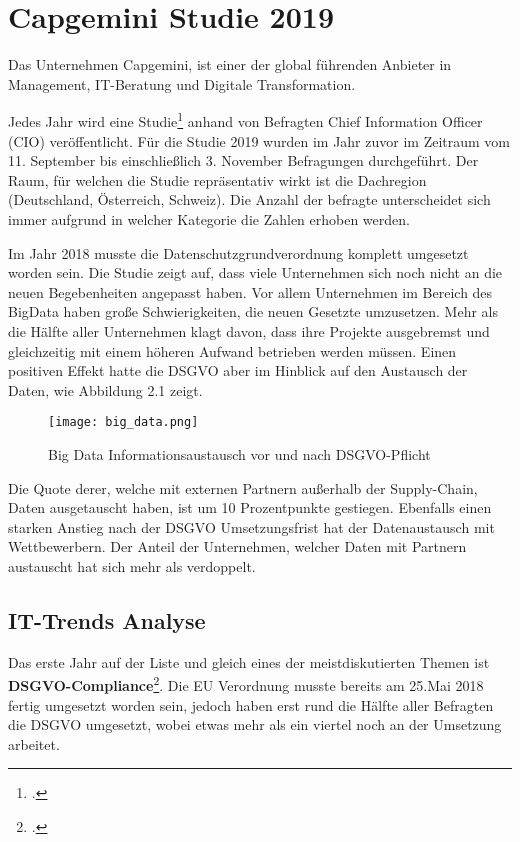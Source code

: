 \section{Capgemini Studie 2019}
Das Unternehmen Capgemini, ist einer der global führenden Anbieter in Management, IT-Beratung und Digitale Transformation.

Jedes Jahr wird eine Studie\footcite{Capgemini-Studie} anhand von Befragten Chief Information Officer (CIO) veröffentlicht. Für die Studie 2019 wurden im Jahr zuvor im Zeitraum vom 11. September bis einschließlich 3. November Befragungen durchgeführt. Der Raum, für welchen die Studie repräsentativ wirkt ist die Dachregion (Deutschland, Österreich, Schweiz). Die Anzahl der befragte unterscheidet sich immer aufgrund in welcher Kategorie die Zahlen erhoben werden.

Im Jahr 2018 musste die Datenschutzgrundverordnung komplett umgesetzt worden sein. Die Studie zeigt auf, dass viele Unternehmen sich noch nicht an die neuen Begebenheiten angepasst haben. Vor allem Unternehmen im Bereich des BigData haben große Schwierigkeiten, die neuen Gesetzte umzusetzen. Mehr als die Hälfte aller Unternehmen klagt davon, dass ihre Projekte ausgebremst und gleichzeitig mit einem höheren Aufwand betrieben werden müssen.
Einen positiven Effekt hatte die DSGVO aber im Hinblick auf den Austausch der Daten, wie Abbildung 2.1 zeigt.
\begin{center}
\begin{figure}[h]
    \centering
    \texttt{[image: big\_data.png]}
    \caption{Big Data Informationsaustausch vor und nach DSGVO-Pflicht}
\end{figure}
\end{center}
Die Quote derer, welche mit externen Partnern außerhalb der Supply-Chain, Daten ausgetauscht haben, ist um 10 Prozentpunkte gestiegen. Ebenfalls einen starken Anstieg nach der DSGVO Umsetzungsfrist hat der Datenaustausch mit Wettbewerbern. Der Anteil der Unternehmen, welcher Daten mit Partnern austauscht hat sich mehr als verdoppelt.
\subsection{IT-Trends Analyse}
Das erste Jahr auf der Liste und gleich eines der meistdiskutierten Themen ist \textbf{DSGVO-Compliance}\footcite{Capgemini-Studie}. Die EU Verordnung musste bereits am 25.Mai 2018 fertig umgesetzt worden sein, jedoch haben erst rund die Hälfte aller Befragten die DSGVO umgesetzt, wobei etwas mehr als ein viertel noch an der Umsetzung arbeitet.

